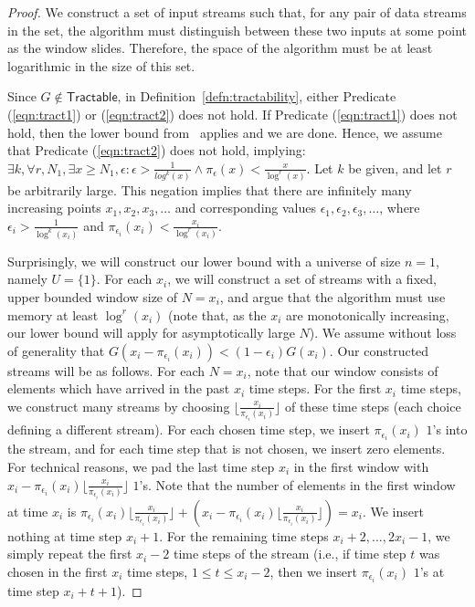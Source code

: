 \documentclass[11pt]{article}
\begin{document}
\begin{proof}
We construct a set of input streams such that, for any pair of data streams in the set, the algorithm must distinguish
between these two inputs at some point as the window slides.  Therefore, the space of the algorithm must be at least
logarithmic in the size of this set.

Since $G \not\in \mathsf{Tractable}$, in Definition~\ref{defn:tractability}, either
Predicate (\ref{eqn:tract1}) or (\ref{eqn:tract2}) does not hold.  If Predicate (\ref{eqn:tract1})
does not hold, then the lower bound from~\cite{BO10} applies and we are done.
Hence, we assume that
Predicate (\ref{eqn:tract2}) does not hold, implying:
$\exists k, \forall r,N_1, \exists x \geq N_1, \epsilon : \epsilon > \frac{1}{log^k(x)} \wedge
\pi_\epsilon(x) < \frac{x}{\log^r(x)}.$
Let $k$ be given, and let $r$ be arbitrarily large.  This negation implies that there are infinitely many
increasing points $x_1,x_2,x_3,\ldots$ and
corresponding values $\epsilon_1,\epsilon_2,\epsilon_3, \ldots$, where $\epsilon_i > \frac{1}{\log^k(x_i)}$
and $\pi_{\epsilon_i}(x_i) < \frac{x_i}{\log^r(x_i)}$.

Surprisingly, we will construct our lower bound with a universe of size $n=1$, namely $U = \{1\}$.  For each $x_i$,
we will construct a set of streams with a fixed, upper bounded window size of $N=x_i$, and argue that the algorithm
must use memory at least $\log^r(x_i)$ (note that, as the $x_i$ are monotonically increasing, our lower bound will apply
for asymptotically large $N$).  We assume without loss of generality that
$G(x_i - \pi_{\epsilon_i}(x_i)) < (1-\epsilon_i)G(x_i)$.  Our constructed streams will be as follows.
For each $N = x_i$, note that our window
consists of elements which have arrived in the past $x_i$ time steps.  For the first $x_i$ time steps, we
construct many streams by choosing $\lfloor\frac{x_i}{\pi_{\epsilon_i}(x_i)}\rfloor$ of these time steps
(each choice defining a different stream).  For each chosen time step, we insert $\pi_{\epsilon_i}(x_i)$ $1$'s into
the stream, and for each time step that is not chosen, we insert zero elements.  For technical reasons, we pad
the last time step $x_i$ in the first window with
$x_i - \pi_{\epsilon_i}(x_i)\lfloor\frac{x_i}{\pi_{\epsilon_i}(x_i)}\rfloor$ $1$'s.  Note that the
number of elements in the first window at time $x_i$ is
$\pi_{\epsilon_i}(x_i)\lfloor\frac{x_i}{\pi_{\epsilon_i}(x_i)}\rfloor +
(x_i - \pi_{\epsilon_i}(x_i)\lfloor\frac{x_i}{\pi_{\epsilon_i}(x_i)}\rfloor) = x_i$.  We insert nothing at
time step $x_i + 1$.  For the remaining time steps $x_i + 2, \ldots, 2x_i - 1$, we simply repeat the first
$x_i - 2$ time steps of the stream (i.e., if time step $t$ was chosen in the first $x_i$ time steps,
$1 \leq t \leq x_i - 2$, then we insert $\pi_{\epsilon_i}(x_i)$ $1$'s at time step $x_i + t + 1$).


\end{proof}
\end{document}
